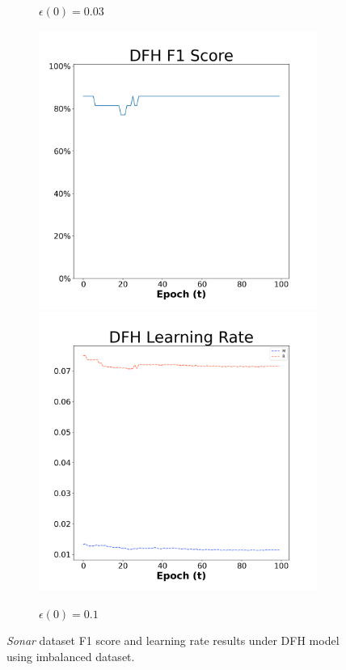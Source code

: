 \begin{figure}[H]
\begin{subfigure}{0.3\textwidth}
  \caption{$\epsilon(0)=0.03$}
\end{subfigure}\hfil %
\begin{subfigure}{0.3\textwidth}
  \includegraphics[width=\linewidth]{images/exper2/Sonar/DFH_0.1_f1.png}
  \includegraphics[width=\linewidth]{images/exper2/Sonar/DFH_0.1_lr.png}
  \caption{$\epsilon(0)=0.1$}
\end{subfigure}

\caption{\textit{Sonar} dataset F1 score and learning rate results under DFH model using imbalanced dataset.}
\end{figure}

